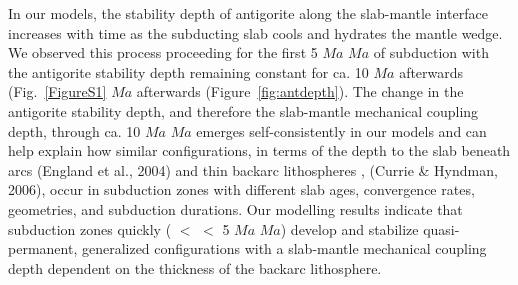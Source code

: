 \documentclass[draft,linenumbers]{agujournal2018} %
\providecommand{\DIFaddtex}[1]{{\protect\color{blue} \sf #1}} %
\providecommand{\DIFdeltex}[1]{{\protect\color{red} \scriptsize #1}} %
\providecommand{\DIFaddbegin}{} %
\providecommand{\DIFaddend}{} %
\providecommand{\DIFdelbegin}{} %
\providecommand{\DIFdelend}{} %
\providecommand{\DIFadd}[1]{\texorpdfstring{\DIFaddtex{#1}}{#1}} %
\providecommand{\DIFdel}[1]{\texorpdfstring{\DIFdeltex{#1}}{}} %
\newcommand{\DIFscaledelfig}{0.3}
\newlength{\DIFdelgraphicswidth} %
\newlength{\DIFdelgraphicsheight} %
\newcommand{\DIFaddincludegraphics}[2][]{{\color{blue}\fbox{\DIFOincludegraphics[#1]{#2}}}} %
\newcommand{\DIFdelincludegraphics}[2][]{%
\sbox{\DIFdelgraphicsbox}{\DIFOincludegraphics[#1]{#2}}%
\settoboxwidth{\DIFdelgraphicswidth}{\DIFdelgraphicsbox} %
\settoboxtotalheight{\DIFdelgraphicsheight}{\DIFdelgraphicsbox} %
\scalebox{\DIFscaledelfig}{%
\parbox[b]{\DIFdelgraphicswidth}{\usebox{\DIFdelgraphicsbox}\\[-\baselineskip] \rule{\DIFdelgraphicswidth}{0em}}\llap{\resizebox{\DIFdelgraphicswidth}{\DIFdelgraphicsheight}{%
\setlength{\unitlength}{\DIFdelgraphicswidth}%
\begin{picture}(1,1)%
\thicklines\linethickness{2pt} %
{\color[rgb]{1,0,0}\put(0,0){\framebox(1,1){}}}%
{\color[rgb]{1,0,0}\put(0,0){\line( 1,1){1}}}%
{\color[rgb]{1,0,0}\put(0,1){\line(1,-1){1}}}%
\end{picture}%
}\hspace*{3pt}}} %
} %
\DeclareRobustCommand{\DIFaddbegin}{\DIFOaddbegin \let\includegraphics\DIFaddincludegraphics} %
\DeclareRobustCommand{\DIFaddend}{\DIFOaddend \let\includegraphics\DIFOincludegraphics} %
\DeclareRobustCommand{\DIFdelbegin}{\DIFOdelbegin \let\includegraphics\DIFdelincludegraphics} %
\DeclareRobustCommand{\DIFdelend}{\DIFOaddend \let\includegraphics\DIFOincludegraphics} %
\begin{document}
\DIFaddend In our models, the stability depth of antigorite along the slab-mantle
interface increases with time as the subducting slab cools and hydrates
the mantle wedge. We observed this process \DIFdelbegin \DIFdel{proceeding }\DIFdelend for the first 5 \DIFdelbegin \DIFdel{$Ma$ }\DIFdelend \DIFaddbegin \DIFadd{\(Ma\) }\DIFaddend of
subduction with the antigorite stability depth remaining constant for
ca. 10 \DIFdelbegin \DIFdel{$Ma$ afterwards (Fig.~\ref{FigureS1}}\DIFdelend \DIFaddbegin \DIFadd{\(Ma\) afterwards (Figure~\ref{fig:antdepth}}\DIFaddend ). The change in the
antigorite stability depth, and therefore the slab-mantle mechanical
coupling depth, through ca. 10 \DIFdelbegin \DIFdel{$Ma$ }\DIFdelend \DIFaddbegin \DIFadd{\(Ma\) }\DIFaddend emerges self-consistently in our
models and can help explain how similar configurations, in terms of the
depth to the slab beneath arcs \DIFdelbegin %
\DIFdelend \DIFaddbegin \DIFadd{(England et al., 2004) }\DIFaddend and thin backarc
lithospheres \DIFdelbegin %
\DIFdel{, }\DIFdelend \DIFaddbegin \DIFadd{(Currie \& Hyndman, 2006), }\DIFaddend occur in subduction zones with
different slab ages, convergence rates, geometries, and subduction
durations. Our modelling results indicate that subduction zones quickly
(\DIFdelbegin \DIFdel{$<$ }\DIFdelend \DIFaddbegin \DIFadd{\(<\) }\DIFaddend 5 \DIFdelbegin \DIFdel{$Ma$}\DIFdelend \DIFaddbegin \DIFadd{\(Ma\)}\DIFaddend ) develop and stabilize quasi-permanent, generalized
configurations with a slab-mantle mechanical coupling depth dependent on
the thickness of the backarc lithosphere.
\end{document}
